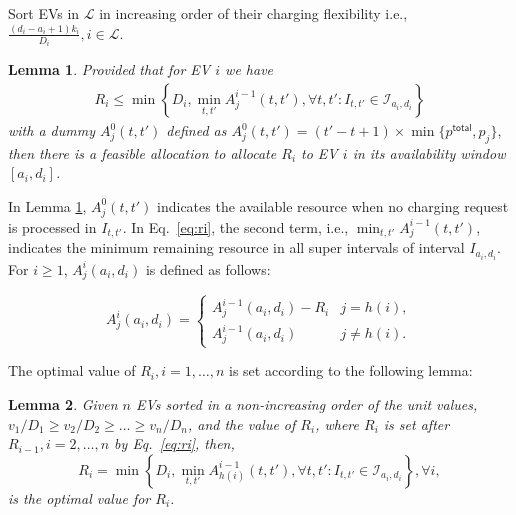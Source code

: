 \documentclass[journal]{IEEEtran}
\newcommand{\bee}{\begin{eqnarray}}
\newcommand{\eee}{\end{eqnarray}}
\newtheorem{lem}{Lemma}
\begin{document}
{\begin{algorithm}[t]
{	Sort EVs in $\mathcal{L}$ in increasing order of their charging flexibility i.e., $\frac{(d_i-a_i+1)k_i}{D_i}, i\in \mathcal{L}$. 
	
	
	}
\end{algorithm}



\begin{lem}
	Provided that for EV $i$ we have 
	\bee
	\label{eq:ri}
	R_i\leq\min\left\{D_i, \min_{t,t'} A^{i-1}_j(t,t'), \forall t,t': I_{t,t'}\in\mathcal{I}_{a_i,d_i}\right\}
	\eee
	 with a dummy $A^0_j(t,t')$ defined as
$A^0_j(t,t')=(t'-t+1)\times\min \{p^\mathsf{total},p_{j}\},$
	then there is a feasible allocation to allocate $R_i$ to EV $i$ in its availability window $[a_i,d_i]$. 
	\label{thm:R_feasible}
\end{lem}


In Lemma \ref{thm:R_feasible}, $A^0_j(t,t')$ indicates the available resource when no charging request is processed in $I_{t,t'}$. 
In Eq.~\eqref{eq:ri}, the second term, i.e., $\min_{t,t'} A^{i-1}_{j}(t,t')$, indicates the minimum remaining resource in all super intervals of interval $I_{a_i,d_i}$. For $i\geq 1$, $A^i_j(a_i,d_i)$ is defined as follows:

\begin{equation*}
A^i_j(a_i,d_i)=\begin{cases}
A^{i-1}_j(a_i,d_i)-R_i & j=h(i),\\
A^{i-1}_j(a_i,d_i) & j\neq h(i).
\end{cases} 
\end{equation*}

The optimal value of $R_i, i=1,\dots ,n$ is set according to the following lemma:

\begin{lem}
	Given $n$ EVs sorted in a non-increasing order of the unit values, ${v_1\slash D_1\geq v_2\slash D_2\geq\dots \geq v_n\slash D_n}$, and the value of $R_i$, where $R_i$ is set after $R_{i-1}, i=2,\dots ,n$ by Eq.~\eqref{eq:ri}, then, 
	$$R_i = \min\left\{D_i, \min_{t,t'} A^{i-1}_{h(i)}(t,t'), \forall t,t':I_{t,t'}\in\mathcal{I}_{a_i,d_i}\right\},\forall i,$$
	is the optimal value for $R_i$. 
	\label{thm:R_star}
\end{lem}

}
\end{document}
